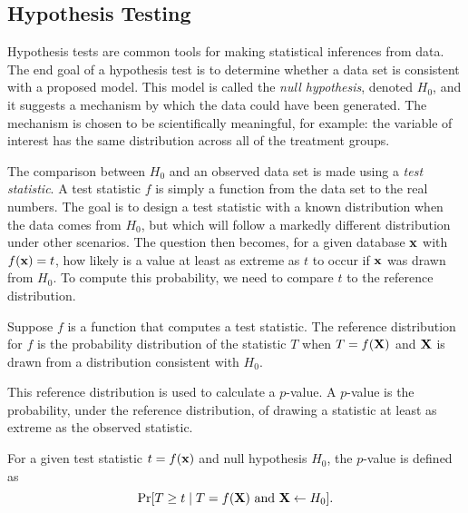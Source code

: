
\subsection{Hypothesis Testing}
Hypothesis tests are common tools for making statistical inferences from data. The end goal of a hypothesis test is to determine whether a data set is consistent with a proposed model. This model is called the \textit{null hypothesis}, denoted $H_0$, and it suggests a mechanism by which the data could have been generated. The mechanism is chosen to be scientifically meaningful, for example: the variable of interest has the same distribution across all of the treatment groups.

The comparison between $H_0$ and an observed data set is made using a \textit{test statistic}.  A test statistic $f$ is simply a function from the data set to the real numbers.  The goal is to design a test statistic with a known distribution when the data comes from $H_0$, but which will follow a markedly different distribution under other scenarios.  The question then becomes, for a given database $\mathbf{x}$ with $f(\mathbf{x})=t$, how likely is a value at least as extreme as $t$ to occur if $\mathbf{x}$ was drawn from $H_0$.  To compute this probability, we need to compare $t$ to the reference distribution.


\begin{definition} \label{def:refdist}
Suppose $f$ is a function that computes a test statistic. The reference distribution for $f$ is the probability distribution of the statistic $T$ when $T=f(\mathbf{X})$ and $\mathbf{X}$ is drawn from a distribution consistent with $H_0$.
\end{definition}

This reference distribution is used to calculate a $p$-value. A $p$-value is the probability, under the reference distribution, of drawing a statistic at least as extreme as the observed statistic.

\begin{definition}[$p$-value] \label{def:pvalue}
For a given test statistic $t=f(\mathbf{x})$ and null hypothesis $H_0$, the $p$-value is defined as
\begin{equation*}
\Pr[T\geq t \mid T = f(\mathbf{X}) \text{ and } \mathbf{X} \leftarrow H_0].
\end{equation*}
\end{definition}

